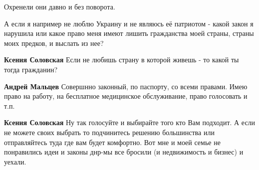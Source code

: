 \begin{itemize}
 
Охренели они давно и без поворота.

 
А если я например не люблю Украину и не являюсь её патриотом - какой закон я
нарушила или какое право меня имеют лишить гражданства моей страны, страны моих
предков, и выслать из нее?

\begin{itemize}
 
\textbf{Ксения Соловская} Если не любишь страну в которой живешь - то какой ты тогда гражданин?

 
\textbf{Андрей Мальцев} Совершнно законный, по паспорту, со всеми правами. Имею право на работу, на бесплатное медицинское обслуживание, право голосовать и т.п.

 
\textbf{Ксения Соловская} Ну так голосуйте и выбирайте того кто Вам подходит. А если не можете своих выбрать то подчинитесь решению большинства или отправляйтесь туда где вам будет комфортно. Вот мне и моей семье не понравились идеи и законы днр-мы все бросили (и недвижимость и бизнес) и уехали.

 

\end{itemize}
\end{itemize}
